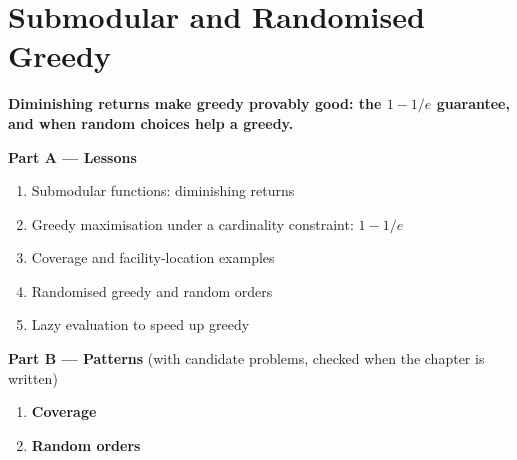 \chapter{Submodular and Randomised Greedy}
\label{ch:submodular}

\begin{tcolorbox}[enhanced, colback=white, colframe=secondaryblue, boxrule=1pt, arc=2mm]
\textbf{\large\textcolor{primaryblue}{Diminishing returns make greedy provably good: the $1 - 1/e$ guarantee, and when random choices help a greedy.}}
\end{tcolorbox}


\begin{plannedbox}
\textbf{Part A --- Lessons}
\begin{enumerate}[leftmargin=*, label=\textbf{A\arabic*.}, itemsep=1pt]
    \item Submodular functions: diminishing returns
    \item Greedy maximisation under a cardinality constraint: $1 - 1/e$
    \item Coverage and facility-location examples
    \item Randomised greedy and random orders
    \item Lazy evaluation to speed up greedy
\end{enumerate}
\textbf{Part B --- Patterns} (with candidate problems, checked when the chapter is written)
\begin{enumerate}[leftmargin=*, label=\textbf{P\arabic*.}, itemsep=1pt]
    \item \textbf{Coverage}
    \item \textbf{Random orders}
\end{enumerate}
\end{plannedbox}
